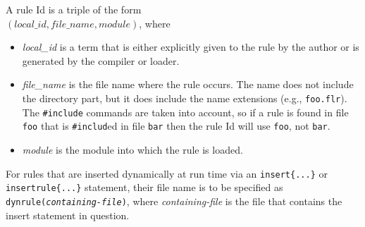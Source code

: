 \documentclass[11pt]{article}
\newcommand{\flrext}{flr}
\begin{document}
A rule Id is a triple of the form\\
$(local\_id,file\_name,module)$, where
\begin{itemize}
\item \emph{local\_id} is a term that is either explicitly given to the rule
  by the author or is generated by the compiler or loader.
\item \emph{file\_name} is the file name where the rule occurs. The name
  does not include the directory part, but it does include the name
  extensions (e.g., \texttt{foo.\flrext}). The \texttt{\#include} commands are
  taken into account, so if a rule is found in file \texttt{foo} that is
  \texttt{\#includ}ed in file \texttt{bar} then the rule Id will use
  \texttt{foo}, not \texttt{bar}.
\item \emph{module} is the module into which the rule is loaded. 
\end{itemize}
For rules that are inserted dynamically at run time
via an \texttt{insert\{...\}} or
\texttt{insertrule\{...\}}  statement, their file name is to be specified
as \texttt{dynrule(\textnormal{\emph{containing-file}})},
where \emph{containing-file} is the file that contains the insert
statement in question. 
\end{document}
